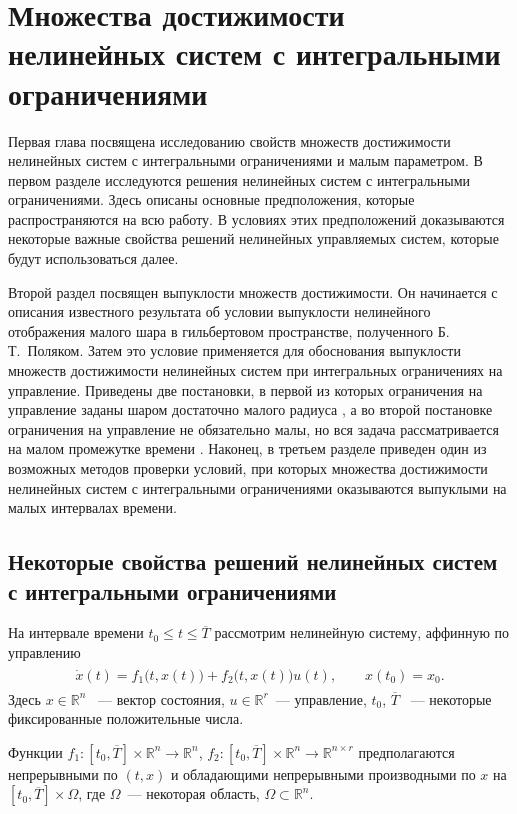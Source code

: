 \documentclass[../main.tex]{subfiles}
\begin{document}
\clearpage
\section{Множества достижимости нелинейных систем с интегральными ограничениями}
\label{s1}
Первая глава посвящена исследованию свойств множеств достижимости нелинейных систем с интегральными ограничениями и малым параметром.
В первом разделе исследуются решения нелинейных систем с интегральными ограничениями.
Здесь описаны основные предположения, которые распространяются на всю работу.
В условиях этих предположений доказываются некоторые важные свойства решений нелинейных управляемых систем, которые будут использоваться далее. 
 
Второй раздел посвящен выпуклости множеств достижимости.
Он начинается с описания известного результата об условии выпуклости нелинейного отображения малого шара в гильбертовом пространстве, полученного Б.\,Т.~Поляком\cite{Polyak2001, Polyak2001ru}.
Затем это условие применяется для обоснования выпуклости множеств достижимости нелинейных систем при интегральных ограничениях на управление.
Приведены две постановки, в первой из которых ограничения на управление заданы шаром достаточно малого радиуса \cite{Polyak2004}, а во второй постановке ограничения на управление не обязательно малы, но вся задача рассматривается на малом промежутке времени \cite{GusevMotor, GusevOsipovTrudy}.
Наконец, в третьем разделе приведен один из возможных методов проверки условий, при которых множества достижимости нелинейных систем с интегральными ограничениями оказываются выпуклыми на малых интервалах времени. 
 
 
\subsection{Некоторые свойства решений нелинейных систем с интегральными ограничениями}
На интервале времени $ t_0 \leqslant t \leqslant \overline{T} $ рассмотрим нелинейную систему, аффинную по управлению
\begin{gather}\label{s1:common_nonlinear}
\begin{gathered}
 \dot{x}(t)=f_1\big(t,x(t)\big)+f_2\big(t,x(t)\big)u(t), \qquad x(t_0) = x_0.
\end{gathered}
\end{gather}
Здесь $ x \in \mathbb{R}^n $ ~--- вектор состояния, $ u \in \mathbb{R}^r $~--- управление, $t_0$, $ \overline{T} $ ~--- некоторые фиксированные положительные числа.
 
Функции $ f_1: [t_0, \overline{T}] \times \mathbb{R}^n \rightarrow \mathbb{R}^{n} $, $ f_2: [t_0, \overline{T}] \times \mathbb{R}^n \rightarrow \mathbb{R}^{n \times r} $ предполагаются непрерывными по $(t,x)$ и обладающими непрерывными производными по $ x $ на $ [t_0, \overline{T}] \times \Omega $, где $\Omega$~--- некоторая область, $\Omega \subset \mathbb{R}^n$. 
\end{document}
